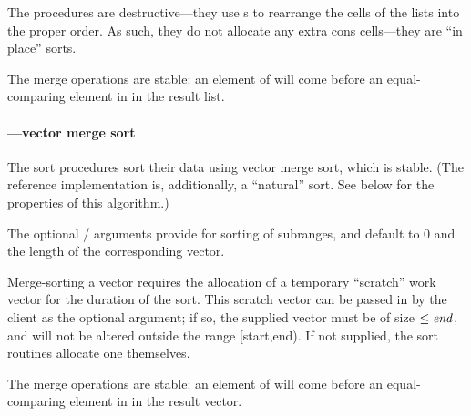 The \code{!} procedures are destructive---they use s to
rearrange the cells of the lists into the proper order. As such, they
do not allocate any extra cons cells---they are ``in place'' sorts.

The merge operations are stable: an element of  will
come before an equal-comparing element in  in the result
list.

\paragraph{---vector merge sort}

\begin{protos}
\end{protos}
%
The sort procedures sort their data using vector merge sort, which is
stable. (The reference implementation is, additionally, a ``natural'' sort.
See below for the properties of this algorithm.)

The optional / arguments provide for sorting of subranges, and
default to 0 and the length of the corresponding vector.
    
Merge-sorting a vector requires the allocation of a temporary
``scratch'' work vector for the duration of the sort. This scratch
vector can be passed in by the client as the optional 
argument; if so, the supplied vector must be of size $\leq \var{end}$,
and will not be altered outside the range [start,end). If not
supplied, the sort routines allocate one themselves.

The merge operations are stable: an element of  will
come before an equal-comparing element in  in the
result vector.

